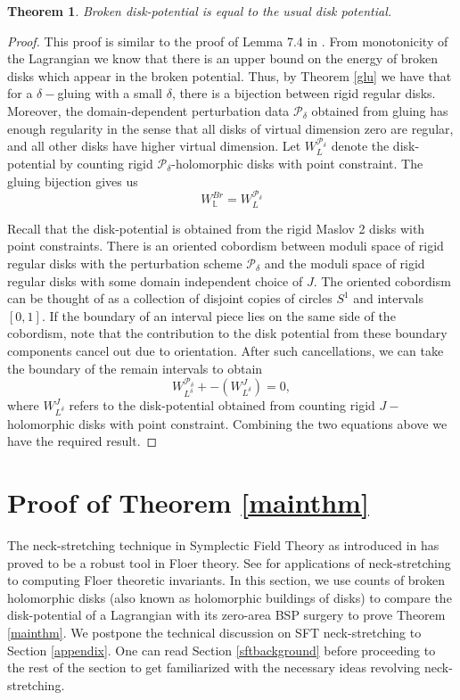 \documentclass[11pt, oneside,dvipsnames]{amsart}
\newcommand{\<}{\langle}
\renewcommand{\>}{\rangle}
\newcommand{\bL}{\mathbb{L}}
\newcommand{\cP}{\mathcal{P}}
\newtheorem{Theorem}{Theorem}[section]
\theoremstyle{definition}
\theoremstyle{definition}
\numberwithin{equation}{subsection}
\begin{document}



\begin{Theorem}\label{thm:brokissame}
Broken disk-potential is equal to the usual disk potential.
\end{Theorem}

\begin{proof}
    This proof is similar to the proof of Lemma 7.4 in \cite{Cha23}. From monotonicity of the Lagrangian we know that there is an upper bound on the energy of broken disks which appear in the broken potential. Thus, by Theorem \ref{glu} we have that for a $\delta-$gluing with a small $\delta$, there is a bijection between rigid regular disks. Moreover, the domain-dependent perturbation data $\cP_\delta$ obtained from gluing has enough regularity in the sense that all disks of virtual dimension zero are regular, and all other disks have higher virtual dimension. Let $W^{\cP_\delta}_L$ denote the disk-potential by counting rigid $\cP_\delta$-holomorphic disks with point constraint. The gluing bijection gives us $$W^{Br}_{\bL} =  W^{\cP_\delta}_L$$
    
    Recall that the disk-potential is obtained from the rigid Maslov 2 disks with point constraints. There is an oriented cobordism  between moduli space of rigid regular disks  with the perturbation scheme $\cP_\delta$ and the moduli space of rigid regular disks with some domain independent choice of $J$. The oriented cobordism can be thought of as a collection of disjoint copies of circles $S^1$ and intervals $[0,1]$. If the boundary of an interval piece lies on the same side of the cobordism, note that the contribution to the disk potential from these boundary components cancel out due to orientation. After such cancellations, we can take the boundary of the remain intervals to obtain $$W^{\cP_\delta}_{L^\delta} + -(W^{J}_{L^\delta}) = 0,$$ where $W^J_{L^\delta}$ refers to the disk-potential obtained from counting rigid $J-$holomorphic disks with point constraint. Combining the two equations above we have the required result.
\end{proof}



\section{Proof of Theorem \ref{mainthm}}

The neck-stretching technique in Symplectic Field Theory as introduced in \cite{egh00,BEH03} has proved to be a robust tool in Floer theory. See \cite{mw18,mw19,PW19,Via16,Cha23} for applications of neck-stretching to computing Floer theoretic invariants. In this section, we use counts of broken holomorphic disks (also known as holomorphic buildings of disks) to compare the disk-potential of a Lagrangian with its zero-area BSP surgery to prove Theorem \ref{mainthm}.  We postpone the technical discussion on SFT neck-stretching to Section \ref{appendix}. One can read Section \ref{sftbackground} before proceeding to the rest of the section to get familiarized with the necessary ideas revolving neck-stretching.
\end{document}
